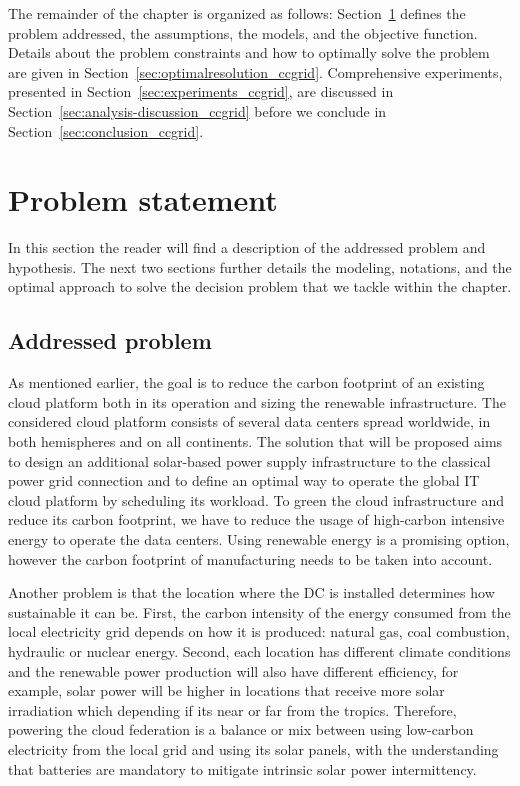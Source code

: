 \bigskip

The remainder of the chapter is organized as follows: Section~\ref{sec:problemStatement_ccgrid} defines the problem addressed, the assumptions, the models, and the objective function. Details about the problem constraints and how to optimally solve the problem are given in Section~\ref{sec:optimalresolution_ccgrid}. Comprehensive experiments, presented in Section~\ref{sec:experiments_ccgrid}, are discussed in Section~\ref{sec:analysis-discussion_ccgrid} before we conclude in Section~\ref{sec:conclusion_ccgrid}. 

\section{Problem statement}
\label{sec:problemStatement_ccgrid}

In this section the reader will find a description of the addressed problem and hypothesis. The next two sections further details the modeling, notations, and the optimal approach to solve the decision problem that we tackle within the chapter. 



\subsection{Addressed problem}
\label{sec:addressedproblem_ccgrid}

As mentioned earlier, the goal is to reduce the carbon footprint of an existing cloud platform both in its operation and sizing the renewable infrastructure. The considered cloud platform consists of several data centers spread worldwide, in both hemispheres and on all continents. The solution that will be proposed aims to design an additional solar-based power supply infrastructure to the classical power grid connection and to define an optimal way to operate the global IT cloud platform by scheduling its workload. To green the cloud infrastructure and reduce its carbon footprint, we have to reduce the usage of high-carbon intensive energy to operate the data centers. Using renewable energy is a promising option, however the carbon footprint of manufacturing needs to be taken into account.

Another problem is that the location where the DC is installed determines how sustainable it can be. First, the carbon intensity of the energy consumed from the local electricity grid depends on how it is produced: natural gas, coal combustion, hydraulic or nuclear energy. Second, each location has different climate conditions and the renewable power production will also have different efficiency, for example, solar power will be higher in locations that receive more solar irradiation which depending if its near or far from the tropics.  Therefore, powering the cloud federation is a balance or mix between using low-carbon electricity from the local grid and using its solar panels, with the understanding that batteries are mandatory to mitigate intrinsic solar power intermittency. 

